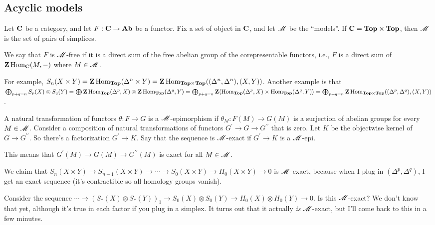 \subsection{Acyclic models}
Let $\mathbf C$ be a category, and let $F:\mathbf C\to\mathbf{Ab}$ be a functor. Fix a set of object in $\mathbf C$, and let $\mathscr M$ be the ``models''. If $\mathbf C=\mathbf{Top}\times\mathbf{Top}$, then $\mathscr M$ is the set of pairs of simplices.
\begin{definition}
We say that $F$ is $\mathscr M$-free if it is a direct sum of the free abelian group of the corepresentable functors, i.e., $F$ is a direct sum of $\mathbf Z\operatorname{Hom}_\mathbf C(M,-)$ where $M\in\mathscr M$.
\end{definition}
\begin{example}
For example, $S_n(X\times Y)=\mathbf Z\operatorname{Hom}_\mathbf{Top}(\Delta^n\times Y)=\mathbf Z\operatorname{Hom}_{\mathbf{Top}\times\mathbf{Top}}((\Delta^n,\Delta^n),(X,Y))$. Another example is that $\bigoplus_{p+q=n}S_p(X)\otimes S_q(Y)=\bigoplus\mathbf Z\operatorname{Hom}_{\mathbf{Top}}(\Delta^p,X)\otimes\mathbf Z\operatorname{Hom}_{\mathbf{Top}}(\Delta^q,Y)=\bigoplus_{p+q=n}\mathbf Z\langle\operatorname{Hom}_{\mathbf{Top}}(\Delta^p,X)\times\operatorname{Hom}_{\mathbf{Top}}(\Delta^q,Y)\rangle=\bigoplus_{p+q=n}\mathbf Z\operatorname{Hom}_{\mathbf{Top}\times\mathbf{Top}}((\Delta^p,\Delta^q),(X,Y))$.
\end{example}
\begin{definition}
A natural transformation of functors $\theta:F\to G$ is a $\mathscr M$-epimorphism if $\theta_M:F(M)\to G(M)$ is a surjection of abelian groups for every $M\in\mathscr M$. Consider a composition of natural transformations of functors $G^\prime\to G\to G^{\prime\prime}$ that is zero. Let $K$ be the objectwise kernel of $G\to G^{\prime\prime}$. So there's a factorization $G^\prime\to K$. Say that the sequence is $\mathscr M$-exact if $G^\prime\to K$ is a $\mathscr M$-epi.

This means that $G^\prime(M)\to G(M)\to G^{\prime\prime}(M)$ is exact for all $M\in\mathscr M$.
\end{definition}
\begin{example}
We claim that $S_n(X\times Y)\to S_{n-1}(X\times Y)\to\cdots\to S_0(X\times Y)\to H_0(X\times Y)\to 0$ is $\mathscr M$-exact, because when I plug in $(\Delta^p,\Delta^q)$, I get an exact sequence (it's contractible so all homology groups vanish).
\end{example}
\begin{example}
Consider the sequence $\cdots\to(S_\ast(X)\otimes S_\ast(Y))_1\to S_0(X)\otimes S_0(Y)\to H_0(X)\otimes H_0(Y)\to 0$. Is this $\mathscr M$-exact? We don't know that yet, although it's true in each factor if you plug in a simplex. It turns out that it actually \emph{is} $\mathscr M$-exact, but I'll come back to this in a few minutes.
\end{example}
